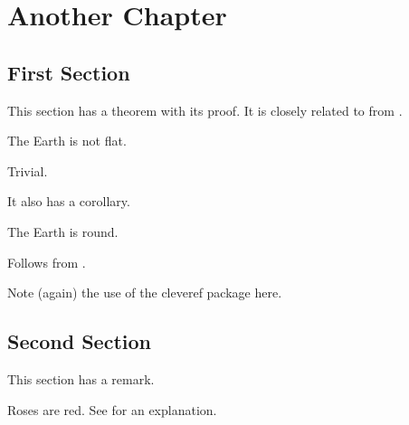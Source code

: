 \chapter{Another  Chapter}\label{chap_second}

\section{First Section}
This section has a theorem with its proof. 
It is closely related to  from . 

\begin{theorem}\label{thm:earth second}
    The Earth is not flat.
\end{theorem}

\begin{IEEEproof}
    Trivial.
\end{IEEEproof}

It also has a corollary.

\begin{corollary}
    The Earth is round.
\end{corollary}

\begin{IEEEproof}
    Follows from .
\end{IEEEproof}
Note (again) the use of the cleveref package here. 

\section{Second Section}
This section has a remark.
\begin{remark}
    Roses are red. See  for an explanation. 
\end{remark}

\lipsum[5-9]


